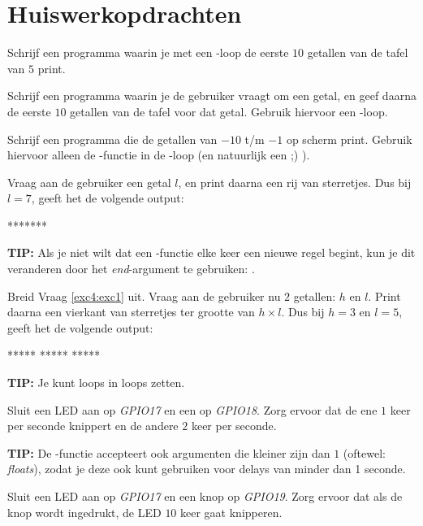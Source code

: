 \newpage

\section{Huiswerkopdrachten}
\vspace{5mm} 
\begin{exercise}
Schrijf een programma waarin je met een -loop de eerste $10$ getallen van de tafel van $5$ print.
\end{exercise}

\begin{exercise}
Schrijf een programma waarin je de gebruiker vraagt om een getal, en geef daarna de eerste $10$ getallen van de tafel voor dat getal. Gebruik hiervoor een -loop.
\end{exercise}

\begin{exercise}
Schrijf een programma die de getallen van $-10$ t/m $-1$ op scherm print. Gebruik hiervoor alleen de -functie in de -loop (en natuurlijk een  ;) ).
\end{exercise}

\begin{exercise}\label{exc5:exc4}
Vraag aan de gebruiker een getal $l$, en print daarna een rij van sterretjes. Dus bij $l=7$, geeft het de volgende output:
\begin{python}
*******
\end{python}
\textbf{TIP:} Als je niet wilt dat een -functie elke keer een nieuwe regel begint, kun je dit veranderen door het \textit{end}-argument te gebruiken: . 
\end{exercise}


\begin{exercise}
Breid Vraag \ref{exc4:exc1} uit. Vraag aan de gebruiker nu $2$ getallen: $h$ en $l$. Print daarna een vierkant van sterretjes ter grootte van $h \times l$. Dus bij $h=3$ en $l=5$, geeft het de volgende output:
\begin{python}
*****
*****
*****
\end{python}
\textbf{TIP:} Je kunt loops in loops zetten. 
\end{exercise}

\begin{exercise}
Sluit een LED aan op \textit{GPIO17} en een op \textit{GPIO18}. Zorg ervoor dat de ene $1$ keer per seconde knippert en de andere $2$ keer per seconde. 

\textbf{TIP:} De -functie accepteert ook argumenten die kleiner zijn dan $1$ (oftewel: \textit{floats}), zodat je deze ook kunt gebruiken voor delays van minder dan 1 seconde.
\end{exercise}

\begin{exercise}
Sluit een LED aan op \textit{GPIO17} en een knop op \textit{GPIO19}. Zorg ervoor dat als de knop wordt ingedrukt, de LED $10$ keer gaat knipperen. 
\end{exercise}
